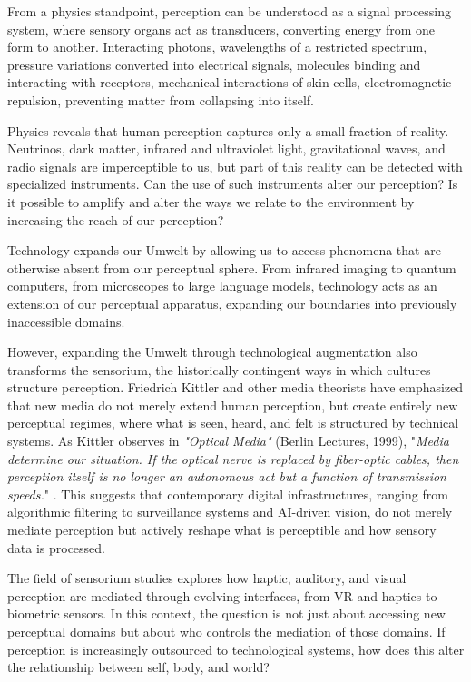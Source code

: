 From a physics standpoint, perception can be understood as a signal processing system, where sensory organs act as transducers, converting energy from one form to another. Interacting photons, wavelengths of a restricted spectrum, pressure variations converted into electrical signals, molecules binding and interacting with receptors, mechanical interactions of skin cells, electromagnetic repulsion, preventing matter from collapsing into itself.

Physics reveals that human perception captures only a small fraction of reality. Neutrinos, dark matter, infrared and ultraviolet light, gravitational waves, and radio signals are imperceptible to us, but part of this reality can be detected with specialized instruments. Can the use of such instruments alter our perception? Is it possible to amplify and alter the ways we relate to the environment by increasing the reach of our perception?

Technology expands our Umwelt by allowing us to access phenomena that are otherwise absent from our perceptual sphere. From infrared imaging to quantum computers, from microscopes to large language models, technology acts as an extension of our perceptual apparatus, expanding our boundaries into previously inaccessible domains.

However, expanding the Umwelt through technological augmentation also transforms the sensorium, the historically contingent ways in which cultures structure perception. Friedrich Kittler and other media theorists have emphasized that new media do not merely extend human perception, but create entirely new perceptual regimes, where what is seen, heard, and felt is structured by technical systems. As Kittler observes in \textit{"Optical Media"} (Berlin Lectures, 1999), "\textit{Media determine our situation. If the optical nerve is replaced by fiber-optic cables, then perception itself is no longer an autonomous act but a function of transmission speeds.}" \citep{kittler1999}. This suggests that contemporary digital infrastructures, ranging from algorithmic filtering to surveillance systems and AI-driven vision, do not merely mediate perception but actively reshape what is perceptible and how sensory data is processed.


The field of sensorium studies explores how haptic, auditory, and visual perception are mediated through evolving interfaces, from VR and haptics to biometric sensors. In this context, the question is not just about accessing new perceptual domains but about who controls the mediation of those domains. If perception is increasingly outsourced to technological systems, how does this alter the relationship between self, body, and world?

